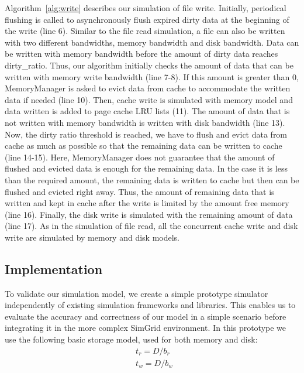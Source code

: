 \documentclass[conference]{IEEEtran}
\begin{document}
			Algorithm~\ref{alg:write} describes our simulation of file write. 
			Initially, periodical flushing is called to asynchronously flush expired 
			dirty data at the beginning of the write (line 6).
			Similar to the file read simulation, a file can also be written with 
			two different bandwidths, memory bandwidth and disk bandwidth. 
			Data can be written with memory bandwidth before the amount 
			of dirty data reaches dirty\_ratio. Thus, our algorithm initially checks 
			the amount of data that can be written with memory write 
			bandwidth (line 7-8).
			If this amount is greater than 0, MemoryManager is asked to evict 
			data from cache to accommodate the written data if needed (line 10). 
			Then, cache write is simulated with memory model and data written is 
			added to page cache LRU lists (11).
			The amount of data that is not written with memory bandwidth is written 
			with disk bandwidth (line 13). 
			Now, the dirty ratio threshold is reached, we have to flush and evict 
			data from cache as much as possible so that 
			the remaining data can be written to cache (line 14-15). 
			Here, MemoryManager does not guarantee that the amount of flushed 
			and evicted data is enough for the remaining data. In the case it is 
			less than the required amount, the remaining data is written to cache 
			but then can be flushed and evicted right away. Thus, the amount 
			of remaining data that is written and kept in cache after the write 
			is limited by the amount free memory (line 16). 
			Finally, the disk write is simulated with the remaining amount of 
			data (line 17). As in the simulation of file read, all the concurrent 
			cache write and disk write are simulated by memory and disk models.
			
		\subsection{Implementation}

			To validate our simulation model, we create a simple prototype
			simulator independently of existing simulation frameworks and libraries. 
			This enables us to evaluate the accuracy and correctness of our 
			model in a simple scenario before integrating it in the more complex SimGrid environment. 
			In this prototype we use the following basic storage model, used for both memory and disk: 
			\begin{align*}
				& t_{r} = D / b_r \\ 
				& t_{w} = D / b_w\
			\end{align*}		
			
\end{document}
